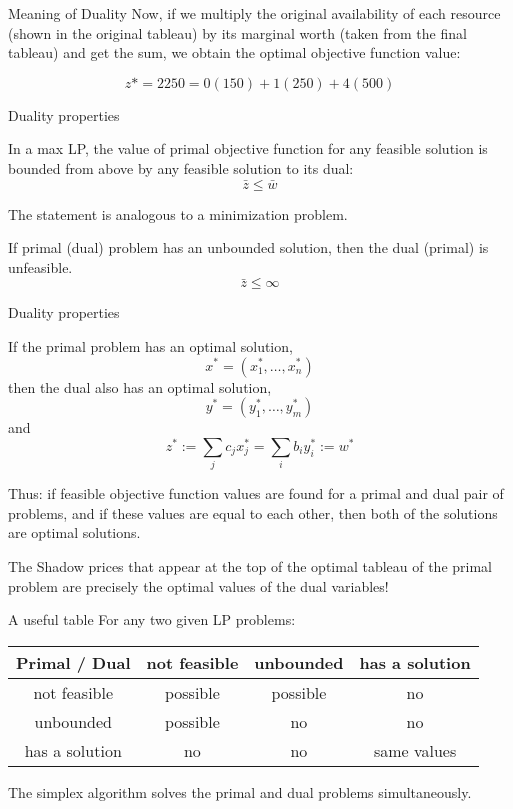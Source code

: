 \documentclass[c]{beamer}
\begin{document}
\begin{frame}[allowframebreaks]{Meaning of Duality}
Now, if we multiply the original availability of each resource (shown in the original tableau) by its marginal worth (taken from the final tableau) and get the sum, we obtain the optimal objective function value:

\[
z* = 2250 = 0(150)+1(250)+4(500)
\]

\end{frame}

\begin{frame}{Duality properties}


\begin{theorem}
  In a max LP, the value of primal objective function for any feasible solution is bounded from above by any feasible solution to its dual:
  \[\bar{z} \leq \bar{w} \]
  \label{the:weak}
\end{theorem}
The statement is analogous to a minimization problem.
\begin{theorem}
  If primal (dual) problem has an unbounded solution, then the dual (primal) is unfeasible.
  \[\bar{z} \leq \infty \]
\end{theorem}
\end{frame}

\begin{frame}[allowframebreaks]{Duality properties}


\begin{theorem}
  If the primal problem has an optimal solution,
  \[
  x^* = (x_1^*, \ldots, x_n^*)
  \]
  then the dual also has an optimal solution,
  \[
  y^* = (y_1^*, \ldots, y_m^*)
  \]
and
\[
z^* := \sum_j c_j x_j^* = \sum_i b_i y_i^* := w^*
\]
\label{the:strong}
\end{theorem}
Thus: if feasible objective function values are found for a primal and dual pair of problems, and if these values are equal to each other, then both of the solutions are optimal solutions.

The Shadow prices that appear at the top of the optimal tableau of the primal problem are precisely the optimal values of the dual variables!
\end{frame}

\begin{frame}{A useful table}
  For any two given LP problems:
\begin{table}
  \begin{tabular}{c|c|c|c}
    Primal / Dual & not feasible & unbounded  & has a solution \\\hline
    not feasible & possible & possible & no \\\hline
    unbounded & possible & no & no \\\hline
    has a solution & no & no & same values\\
  \end{tabular}
\end{table}
The simplex algorithm solves the primal and dual problems simultaneously.
\end{frame}
\end{document}
